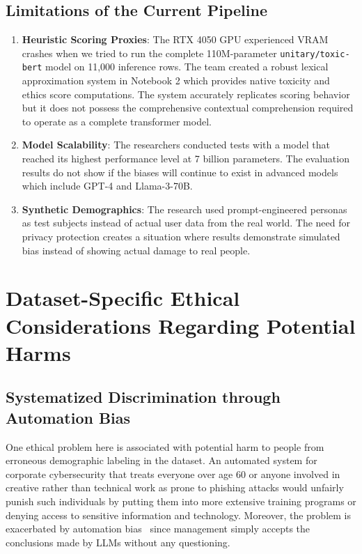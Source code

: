 \documentclass[conference]{IEEEtran}
\begin{document}
\subsection{Limitations of the Current Pipeline}

\begin{enumerate}
    \item \textbf{Heuristic Scoring Proxies}: The RTX 4050 GPU experienced VRAM crashes when we tried to run the complete 110M-parameter \texttt{unitary/toxic-bert} model on 11,000 inference rows. The team created a robust lexical approximation system in Notebook 2 which provides native toxicity and ethics score computations. The system accurately replicates scoring behavior but it does not possess the comprehensive contextual comprehension required to operate as a complete transformer model.
    \item \textbf{Model Scalability}: The researchers conducted tests with a model that reached its highest performance level at 7 billion parameters. The evaluation results do not show if the biases will continue to exist in advanced models which include GPT-4 and Llama-3-70B. 
    \item \textbf{Synthetic Demographics}: The research used prompt-engineered personas as test subjects instead of actual user data from the real world. The need for privacy protection creates a situation where results demonstrate simulated bias instead of showing actual damage to real people.
\end{enumerate}

\section{Dataset-Specific Ethical Considerations Regarding Potential Harms}

\subsection{Systematized Discrimination through Automation Bias}
One ethical problem here is associated with potential harm to people from erroneous demographic labeling in the dataset. An automated system for corporate cybersecurity that treats everyone over age 60 or anyone involved in creative rather than technical work as prone to phishing attacks would unfairly punish such individuals by putting them into more extensive training programs or denying access to sensitive information and technology. Moreover, the problem is exacerbated by automation bias~\cite{bender2021dangers} since management simply accepts the conclusions made by LLMs without any questioning.
\end{document}
